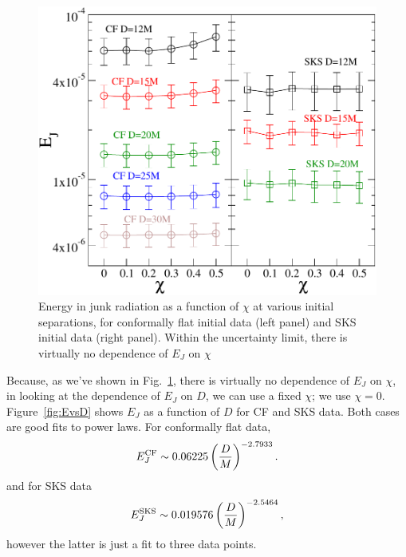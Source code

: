 \documentclass[aps,prd,amsmath,floatfix,twocolumn,superscriptaddress,nofootinbib,showpacs]{revtex4-1}
\theoremstyle{plain}
\theoremstyle{definition}
\begin{document}
\begin{figure}
\includegraphics[width=0.95\columnwidth]{EvsS}
  \caption{Energy in junk radiation as a function of $\chi$ at various
  initial separations, for conformally flat initial data (left panel)
  and SKS initial data (right panel). Within the uncertainty limit,
  there is virtually no dependence of $E_J$ on $\chi$ }
  \label{fig:EvsS}
\end{figure}

Because, as we've shown in Fig.~\ref{fig:EvsS}, there is virtually
no dependence of $E_J$ on $\chi$, in looking at the dependence of
$E_J$ on $D$, we can use a fixed $\chi$; we use
$\chi=0$. Figure~\ref{fig:EvsD} shows $E_J$ as a function of $D$ for
CF and SKS data. Both cases are good fits to power laws. For
conformally flat data,
\begin{equation}
E_J^{\rm CF}\sim 0.06225\left(\frac{D}{M}\right)^{-2.7933}.
\end{equation}
and for SKS data
\begin{equation}
E_J^{\rm SKS}\sim 0.019576\left(\frac{D}{M}\right)^{-2.5464},
\end{equation}
however the latter is just a fit to three data points.

\end{document}

